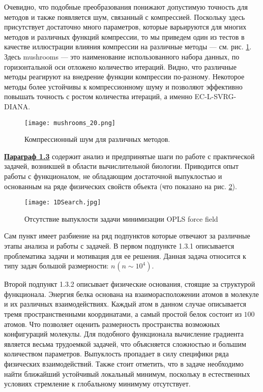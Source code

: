   Очевидно, что подобные преобразования понижают допустимую точность для методов и также появляется шум, связанный с компрессией. Поскольку здесь присутствует достаточно много параметров, которые варьируются для многих методов и различных функций компрессии, то мы приведем один из тестов в качестве иллюстрации влияния компрессии на различные методы --- см. рис. \ref{compr}. Здесь mushrooms --- это наименование использованного набора данных, по горизонтальной оси отложено количество итераций. Видно, что различные методы реагируют на внедрение функции компрессии по-разному. Некоторое методы более устойчивы к компрессионному шуму и позволяют эффективно повышать точность с ростом количества итераций, а именно EC-L-SVRG-DIANA.
  \begin{figure}
    \begin{center}
      \texttt{[image: mushrooms\_20.png]}
    \end{center}
    \caption{Компрессионный шум для различных методов.}
    \label{compr}
  \end{figure}

\underline{\textbf{Параграф 1.3}} содержит анализ и предпринятые шаги по работе с практической задачей, возникшей в области вычислительной биологии. Приводится опыт работы с функционалом, не обладающим достаточной выпуклостью и основанным на ряде физических свойств объекта (что показано на рис. \ref{fig1D}). 

\begin{figure}
\begin{center}
    \texttt{[image: 1DSearch.jpg]}
\end{center}
\caption{Отсутствие выпуклости задачи минимизации OPLS force field}
\label{fig1D}
\end{figure}
     
Сам пункт имеет разбиение на ряд подпунктов которые отвечают за различные этапы анализа и работы с задачей. В первом подпункте 1.3.1 описывается проблематика задачи и мотивация для ее решения. Данная задача относится к типу задач большой размерности:  $n_{ }\left(n\sim 10^4\right)$. 

Второй подпункт 1.3.2 описывает физические основания, стоящие за структурой функционала. Энергия белка основана на взаиморасположении атомов в молекуле и их различных взаимодействиях. Каждый атом в данном случае описывается тремя пространственными координатами, а самый простой белок состоит из $100$ атомов. Что позволяет оценить размерность пространства возможных конфигураций молекулы. Для подобного функционала вычисление градиента является весьма трудоемкой задачей, что объясняется сложностью и большим количеством параметров. Выпуклость пропадает в силу специфики ряда физических взаимодействий. Также стоит отметить, что в задаче необходимо найти ближайший устойчивый локальный минимум, поскольку в естественных условиях стремление к глобальному минимуму отсутствует. 

